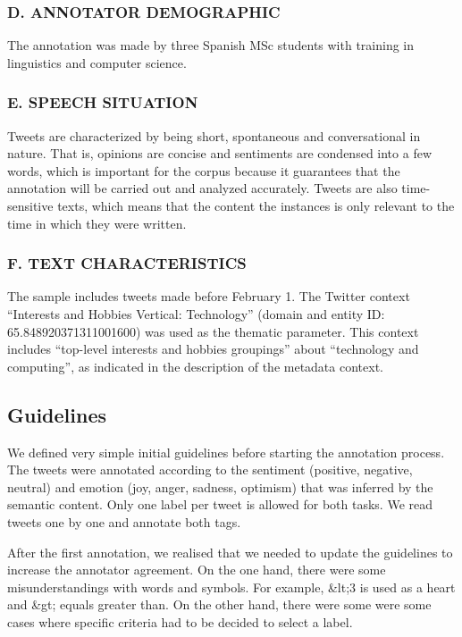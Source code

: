 \documentclass[11pt,a4paper]{article}
\begin{document}
\subsubsection*{D. ANNOTATOR DEMOGRAPHIC}
The annotation was made by three Spanish MSc students with training in linguistics and computer science.

\subsubsection*{E. SPEECH SITUATION}
Tweets are characterized by being short, spontaneous and conversational in nature. That is, opinions are concise and sentiments are condensed into a few words, which is important for the corpus because it guarantees that the annotation will be carried out and analyzed accurately. Tweets are also time-sensitive texts, which means that the content the instances is only relevant to the time in which they were written.

\subsubsection*{F. TEXT CHARACTERISTICS}
The sample includes tweets made before February 1. The Twitter context “Interests and Hobbies Vertical: Technology'' (domain and entity ID: 65.848920371311001600) was used as the thematic parameter. This context includes “top-level interests and hobbies groupings” about “technology and computing”, as indicated in the description of the metadata context.

\subsection{Guidelines}

We defined very simple initial guidelines before starting the annotation process. The tweets were annotated according to the sentiment (positive, negative, neutral) and emotion (joy, anger, sadness, optimism) that was inferred by the semantic content. Only one label per tweet is allowed for both tasks. We read tweets one by one and annotate both tags.

After the first annotation, we realised that we needed to update the guidelines to increase the annotator agreement. On the one hand, there were some misunderstandings with words and symbols. For example, \&lt;3 is used as a heart and \&gt; equals greater than. On the other hand, there were some were some cases where specific criteria had to be decided to select a label.
\end{document}
